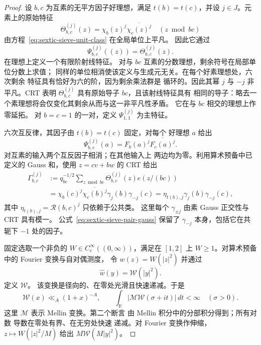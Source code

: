\begin{proof}
设 $b,c$ 为互素的无平方因子好理想，满足 $t(b)=t(c)$，并设
$j\in J$。元素上的原始特征
\[
 \Theta_{b,c}^{(j)}(z)=\chi_b(z)^j\overline{\chi_c(z)^j}
       \quad (z\bmod bc)
\]
由方程~\eqref{eq:sextic-sieve-unit-class} 在全局单位上平凡。
因此它通过
\[
 \Psi_{b,c}^{(j)}((z))=\Theta_{b,c}^{(j)}(z).
\]
在理想上定义一个有限阶射线特征。
对与 $bc$ 互素的分数理想，剩余符号在局部单位分数上求值；
同样的单位相消使该定义与生成元无关。在每个好素理想处，六次剩余
特征具有恰好为六的阶，因为剩余乘法群是
循环的。因此其幂 $j$ 与 $-j$ 非平凡。CRT 表明
$\Theta_{b,c}^{(j)}$ 具有原始导子 $bc$，且该射线特征具有
相同的导子：略去一个素理想将会仅变化其剩余从而与这一非平凡性矛盾。
它在与 $bc$ 相交的理想上作零延拓。
对 $b=c=1$ 的一对，定义 $\Psi_{1,1}^{(j)}$ 为主特征。

六次互反律，其因子由 $t(b)=t(c)$ 固定，对每个
好理想 $a$ 给出
\begin{equation}\label{eq:sextic-sieve-pair-values}
 \Psi_{b,c}^{(j)}(a)=F_b(a)^j\overline{F_c(a)^j}.
\end{equation}
对互素的输入两个互反因子相消；在其他输入上
两边均为零。利用算术预备中已定义的 Gauss 和，使用 $z=cv+bw$ 的 CRT 给出
\begin{equation}\label{eq:sextic-sieve-pair-gauss}
 \begin{split}
 \Gamma_{b,c}^{(j)}
 &:=q_{bc}^{-1/2}\sum_{z\bmod bc}\Theta_{b,c}^{(j)}(z)e(z/(bc))\\
 &=\chi_b(c)^j\overline{\chi_c(b)^j}\gamma_j(b)\gamma_{-j}(c)
  =\eta_{t(b),j}\gamma_j(b)\gamma_{-j}(c),
 \end{split}
\end{equation}
其中 $\eta_{t(b),j}=\mathcal R(b,c)^j$ 只依赖于公共类。
这里每个 $\gamma_{\pm j}$ 由素 Gauss 正交性与 CRT 具有模一。
公式~\eqref{eq:sextic-sieve-pair-gauss} 保留了
$\gamma_{-j}$ 本身，包括它在共轭下 $-1$ 处的因子。

固定选取一个非负的 $W\in C_c^\infty((0,\infty))$，满足在
$[1,2]$ 上 $W\ge1$。对算术预备中的 Fourier 变换与自对偶测度，
令 $w(z)=W(|z|^2)$ 并通过
\[
 \widehat w(y)=\mathscr W(|y|^2).
\]
定义 $\mathscr W$。
该变换是径向的、在零处光滑且快速递减。于是
\begin{equation}\label{eq:sextic-sieve-transform-bounds}
 \mathscr W(x)\ll_A(1+x)^{-A},\qquad
 \int_{\mathbb R}|\mathcal M\mathscr W(\sigma+it)|\,dt<\infty
       \quad(\sigma>0).
\end{equation}
这里 $\mathcal M$ 表示 Mellin 变换。第二个断言
由 Mellin 积分中的分部积分得到；所有对数
导数在零处有界、在无穷处快速
递减。对 Fourier 变换作伸缩，$z\mapsto W(|z|^2/M)$ 给出
$M\mathscr W(M|y|^2)$。


\end{proof}
